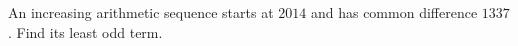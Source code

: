 An increasing arithmetic sequence starts at $2014$ and has common difference $1337$. Find its least odd term.

